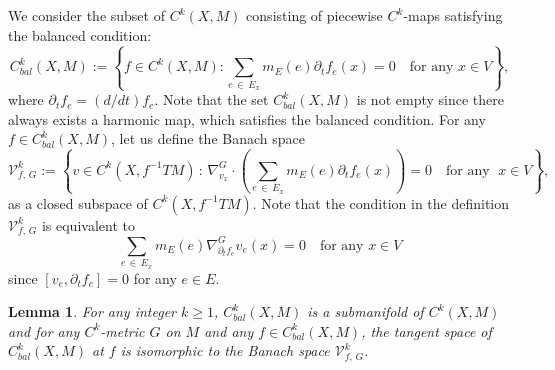 \documentclass[11pt]{article}
\newtheorem{lemm}[theo]{Lemma}
\theoremstyle{definition}
\numberwithin{equation}{section}
\newcommand{\p}{\psi}
\newcommand*\Vc{\mathcal{V}}
\renewcommand*\p{\partial}
\begin{document}
We consider the subset of $C^k(X, M)$ consisting of piecewise $C^k$-maps satisfying the balanced condition:
\[
C^k_{bal}(X,M):=\left\{f\in C^k(X,M): \sum_{e\,\in\,E_x}m_E(e)\p_t f_e (x)=0 \quad \text{for any }x\in V\right\},
\]
where $\p_t f_e=(d/dt)f_e$. Note that the set $C^k_{bal}(X,M)$ is not empty since there always exists a harmonic map, which satisfies the balanced condition. For any $f \in C^k_{bal}(X,M)$, let us define the Banach space
\[
\Vc_{f,\,G}^k:=\!\left\{v\in C^k\left(X, f^{-1}TM\right)\,:\, \nabla^G_{v_x}\cdot \left(\sum_{e\,\in\,E_{x}}m_E(e) \p_t{f}_e(x)\right)=0 \quad \text{for any }\;x\in V\right\},
\]
as a closed subspace of $C^k(X, f^{-1}TM)$. Note that the condition in the definition $\Vc_{f,\,G}^k$ is equivalent to
\[
\sum_{e\,\in\,E_{x}}m_E(e) \nabla^G_{\p_t{f}_e}v_e(x)=0 \quad \text{for any }x\in V
\]
since $[v_e, \p_t{f}_e]=0$ for any $e \in E$.


\begin{lemm}
For any integer $k \ge 1$, $C^k_{bal}(X,M)$ is a submanifold of $C^k(X,M)$ and for any $C^k$-metric $G$ on $M$ and any $f \in C^k_{bal}(X,M)$, the tangent space of $C^k_{bal}(X,M)$ at $f$ is isomorphic to the Banach space $\Vc_{f,\,G}^k$.
\end{lemm}
\end{document}
